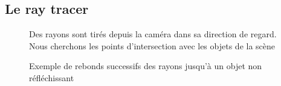 \documentclass[11pt]{article}
\begin{document}
\newpage%
\begin{appendices}
	\section{Le ray tracer}
		\begin{figure}[h!]
		
			\caption{Des rayons sont tirés depuis la caméra dans sa direction de regard. Nous cherchons les points d'intersection avec les objets de la scène}
		\end{figure}
		\FloatBarrier
		\label{annexe:repreCamRayon}

		\begin{figure}[!h]
		
			\caption{Exemple de rebonds successifs des rayons jusqu'à un objet non réfléchissant}
			\label{reflectionsSchema}
		\end{figure}
		\FloatBarrier
		\label{annexe:reflexionsRecursives}
\FloatBarrier
\end{appendices}

\newpage%
\nocite{*}


\end{document}

